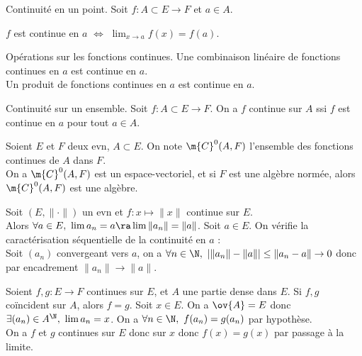 \documentclass[11pt]{article}
\begin{document}
\vspace*{-0.7cm}

\begin{defi}{Continuité en un point.}{}
    Soit $f:A\subset E\to F$ et $a\in A$.
    \begin{center}
        $f$ est continue en $a$ $\iff$ $\lim_{x\to a}f(x)=f(a)$.
    \end{center}
\end{defi}

\vspace*{-0.7cm}

\begin{prop}{Opérations sur les fonctions continues.}{}
    Une combinaison linéaire de fonctions continues en $a$ est continue en $a$.\\
    Un produit de fonctions continues en $a$ est continue en $a$.
\end{prop}

\vspace*{-0.7cm}

\begin{defi}{Continuité sur un ensemble.}{}
    Soit $f:A\subset E \to F$. On a $f$ continue sur $A$ ssi $f$ est continue en $a$ pour tout $a\in A$.
\end{defi}

\vspace*{-0.7cm}

\begin{thm}{}{}
    Soient $E$ et $F$ deux evn, $A\subset E$. On note $\m{C}^0(A,F)$ l'ensemble des fonctions continues de $A$ dans $F$.\\
    On a $\m{C}^0(A,F)$ est un espace-vectoriel, et si $F$ est une algèbre normée, alors $\m{C}^0(A,F)$ est une algèbre.
\end{thm}

\vspace*{-0.7cm}

\begin{ex}{}{}
    Soit $(E,\|\cdot\|)$ un evn et $f:x\mapsto\|x\|$ continue sur $E$.\\
    Alors $\forall a \in E, ~ \lim a_n = a \ra \lim \|a_n\| = \|a\|$.
    \tcblower
    Soit $a\in E$. On vérifie la caractérisation séquentielle de la continuité en $a$ :\\
    Soit $(a_n)$ convergeant vers $a$, on a $\forall n \in \N, ~ |\|a_n\|-\|a\||\leq\|a_n-a\|\to0$ donc par encadrement $\|a_n\|\to\|a\|$.
\end{ex}

\begin{prop}{}{}
    Soient $f,g:E\to F$ continues sur $E$, et $A$ une partie dense dans $E$. Si $f,g$ coïncident sur $A$, alors $f=g$.
    \tcblower
    Soit $x\in E$. On a $\ov{A}=E$ donc $\exists (a_n) \in A^\N, ~ \lim a_n = x$. On a $\forall n \in \N, ~ f(a_n)=g(a_n)$ par hypothèse.\\
    On a $f$ et $g$ continues sur $E$ donc sur $x$ donc $f(x)=g(x)$ par passage à la limite.
\end{prop}
\end{document}
